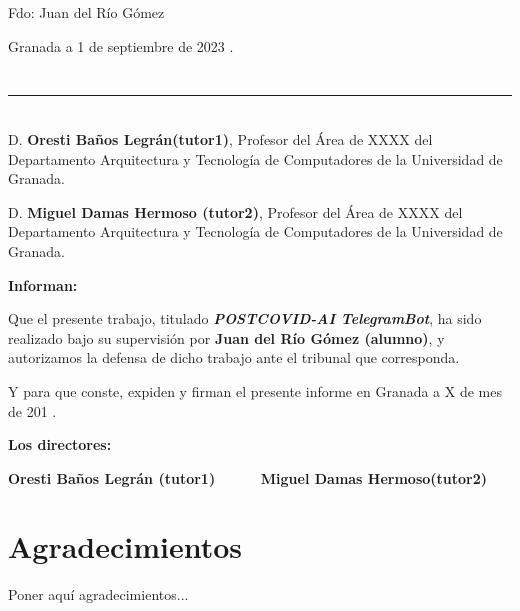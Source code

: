 \noindent Fdo: Juan del Río Gómez


\vspace{2cm}

\begin{flushright}
Granada a 1 de septiembre de 2023 .
\end{flushright}


\chapter*{}
\thispagestyle{empty}

\noindent\rule[-1ex]{\textwidth}{2pt}\\[4.5ex]

D. \textbf{Oresti Baños Legrán(tutor1)}, Profesor del Área de XXXX del Departamento Arquitectura y Tecnología de Computadores de la Universidad de Granada.

\vspace{0.5cm}

D. \textbf{Miguel Damas Hermoso (tutor2)}, Profesor del Área de XXXX del Departamento Arquitectura y Tecnología de Computadores de la Universidad de Granada.


\vspace{0.5cm}

\textbf{Informan:}

\vspace{0.5cm}

Que el presente trabajo, titulado \textit{\textbf{POSTCOVID-AI TelegramBot}},
ha sido realizado bajo su supervisión por \textbf{Juan del Río Gómez (alumno)}, y autorizamos la defensa de dicho trabajo ante el tribunal
que corresponda.

\vspace{0.5cm}

Y para que conste, expiden y firman el presente informe en Granada a X de mes de 201 .

\vspace{1cm}

\textbf{Los directores:}

\vspace{5cm}

\noindent \textbf{Oresti Baños Legrán (tutor1) \ \ \ \ \ Miguel Damas Hermoso(tutor2)}

\chapter*{Agradecimientos}
\thispagestyle{empty}

       \vspace{1cm}


Poner aquí agradecimientos...

